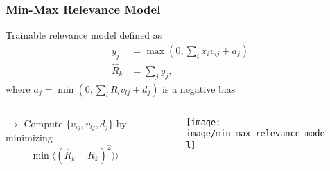 \documentclass{beamer}
\begin{document}
\iffalse
\begin{frame}
\frametitle{Relevance Model}
\vspace{0.25cm}
In deep architectures as in figure 3 a mapping between two layers may be unknown, even if it exists
\begin{block}{Definition 1}
A relevance model is a function that maps a set of neuron activations at a given layer to the relevance of a neuron in a higher layer, and whose output can be redistributed onto its input variables.
\end{block}

\begin{figure}
\label{fig1}
\texttt{[image: image/example\_deep\_network\_one]}
\end{figure}
\vspace{-0.5cm}
\end{frame}
\fi

\begin{frame}
\frametitle{Min-Max Relevance Model}
\vspace{0.4cm}
Trainable relevance model defined as
\begin{align*}
y_j &= \max(0,\sum_ix_iv_{ij} + a_j)\\
\hat{R}_k &= \sum_j y_j,
\end{align*}
where $a_j = \min(0,\sum_l R_l v_{lj} + d_j)$ is a negative bias
\vspace{-0.25cm}


 \begin{columns}
          \begin{column}{5cm}
          		$\rightarrow$ Compute $\{v_{ij}, v_{lj},d_j\}$ by minimizing 
			\begin{equation*}
			\min\langle (\hat{R}_k-R_k)^2) \rangle
			\end{equation*}
            \end{column} 
            \begin{column}{6cm}
			\begin{figure}
			\label{fig1}
			\texttt{[image: image/min\_max\_relevance\_model]}
			\end{figure}
	\end{column}
\end{columns} 

\end{frame}
\end{document}
